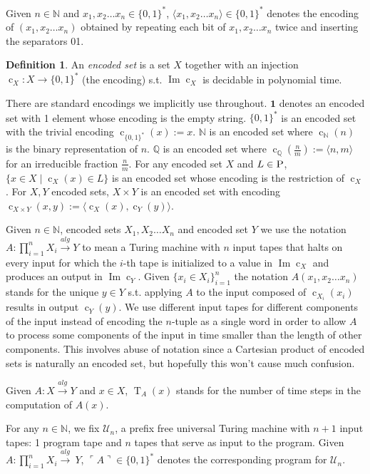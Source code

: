 \documentclass{article}
\numberwithin{equation}{section}
\theoremstyle{definition}
\newtheorem{definition}{Definition}[section]
\theoremstyle{plain}
\newcommand{\Words}{{\{ 0, 1 \}^*}}
\DeclareMathOperator{\Img}{Im}
\DeclareMathOperator{\T}{T}
\DeclareMathOperator{\En}{c}
\newcommand{\Nats}{\mathbb{N}}
\newcommand{\Rats}{\mathbb{Q}}
\newcommand{\Chev}[1]{\langle #1 \rangle}
\newcommand{\Quote}[1]{\ulcorner #1 \urcorner}
\begin{document}
Given $n \in \Nats$ and ${x_1, x_2 \ldots x_n \in \Words}$, $\Chev{x_1,x_2 \ldots x_n} \in \Words$ denotes the encoding of $(x_1,x_2 \ldots x_n)$ obtained by repeating each bit of $x_1, x_2 \ldots x_n$ twice and inserting the separators 01.
\begin{definition}

An \emph{encoded set} is a set $X$ together with an injection ${\En_X: X \rightarrow \Words}$ (the encoding) s.t. $\Img \En_X$ is decidable in polynomial time.

\end{definition}

There are standard encodings we implicitly use throughout. $\bm{1}$ denotes an encoded set with 1 element whose encoding is the empty string. $\Words$ is an encoded set with the trivial encoding ${\En_\Words(x):=x}$. $\Nats$ is an encoded set where $\En_\Nats(n)$ is the binary representation of $n$. $\Rats$ is an encoded set where ${\En_\Rats(\frac{n}{m}):=\Chev{n,m}}$ for an irreducible fraction $\frac{n}{m}$. For any encoded set $X$ and $L \in \textsc{P}$, $\{x \in X \mid \En_X(x) \in L\}$ is an encoded set whose encoding is the restriction of $\En_X$. For $X,Y$ encoded sets, $X \times Y$ is an encoded set with encoding $\En_{X \times Y}(x,y):=\Chev{\En_X(x),\En_Y(y)}$.

Given $n \in \Nats$, encoded sets $X_1, X_2 \ldots X_n$ and encoded set $Y$ we use the notation $A: \prod_{i=1}^n X_i \xrightarrow{alg} Y$ to mean a Turing machine with $n$ input tapes that halts on every input for which the $i$-th tape is initialized to a value in $\Img \En_X$ and produces an output in $\Img \En_Y$. Given $\{x_i \in X_i\}_{i=1}^n$ the notation $A(x_1, x_2 \ldots x_n)$ stands for the unique $y \in Y$ s.t. applying $A$ to the input composed of $\En_{X_i}(x_i)$ results in output $\En_Y(y)$. We use different input tapes for different components of the input instead of encoding the $n$-tuple as a single word in order to allow $A$ to process some components of the input in time smaller than the length of other components. This involves abuse of notation since a Cartesian product of encoded sets is naturally an encoded set, but hopefully this won't cause much confusion.

Given $A: X \xrightarrow{alg} Y$ and $x \in X$, $\T_A(x)$ stands for the number of time steps in the computation of $A(x)$.

For any $n \in \Nats$, we fix $\mathcal{U}_n$, a prefix free universal Turing machine with $n+1$ input tapes: 1 program tape and $n$ tapes that serve as input to the program. Given $A: \prod_{i=1}^n X_i \xrightarrow{alg}\ Y$, $\Quote{A} \in \Words$ denotes the corresponding program for $\mathcal{U}_n$.
\end{document}
